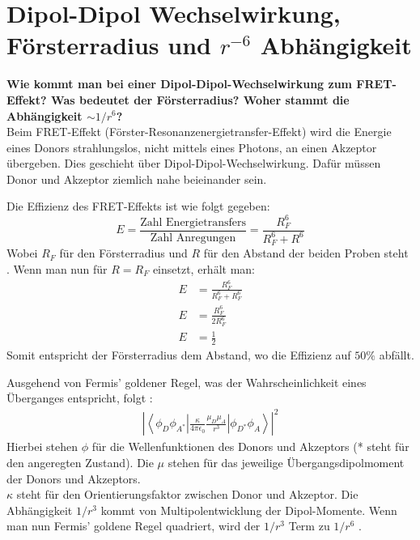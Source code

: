 \section{Dipol-Dipol Wechselwirkung, Försterradius und $r^{-6}$ Abhängigkeit}%
\textbf{Wie kommt man bei einer Dipol-Dipol-Wechselwirkung zum FRET-Effekt? Was bedeutet der Försterradius? Woher stammt die Abhängigkeit $\sim 1/r^6$?}\\
Beim FRET-Effekt (Förster-Resonanzenergietransfer-Effekt) wird die Energie eines Donors strahlungslos, nicht mittels eines Photons, an einen Akzeptor übergeben.
Dies geschieht über Dipol-Dipol-Wechselwirkung. Dafür müssen Donor und Akzeptor ziemlich nahe beieinander sein.\newline

Die Effizienz des FRET-Effekts ist wie folgt gegeben:
\begin{equation}
    E=\frac{\text{Zahl Energietransfers}}{\text{Zahl Anregungen}}=\frac{R_F^6}{R_F^6+R^6}
\end{equation}
Wobei $R_F$ für den Försterradius und $R$ für den Abstand der beiden Proben steht \citep[vgl.][]{Anleitung}.
Wenn man nun für $R=R_F$ einsetzt, erhält man:
\begin{align}
    E&=\frac{R_F^6}{R_F^6+R_F^6}\\
    E&=\frac{R_F^6}{2R_F^6}\\
    E&=\frac{1}{2}
\end{align}
Somit entspricht der Försterradius dem Abstand, wo die Effizienz auf $50\%$ abfällt.\newline

Ausgehend von Fermis' goldener Regel, was der Wahrscheinlichkeit eines Überganges entspricht, folgt \citep[vgl.][]{Anleitung}:
\begin{align}
    \left|\left<\phi_D\phi_{A^*}\left|\frac{\kappa}{4\pi\epsilon_0}\frac{\mu_D\mu_A}{r^3}\right|\phi_{D^*}\phi_A\right>\right|^2
\end{align}
Hierbei stehen $\phi$ für die Wellenfunktionen des Donors und Akzeptors (* steht für den angeregten Zustand).
Die $\mu$ stehen für das jeweilige Übergangsdipolmoment der Donors und Akzeptors.\\
$\kappa$ steht für den Orientierungsfaktor zwischen Donor und Akzeptor.
Die Abhängigkeit $1/r^3$ kommt von Multipolentwicklung der Dipol-Momente.
Wenn man nun Fermis' goldene Regel quadriert, wird der $1/r^3$ Term zu $1/r^6$ \citep[vgl.][]{chemiestack}. 
\newpage
